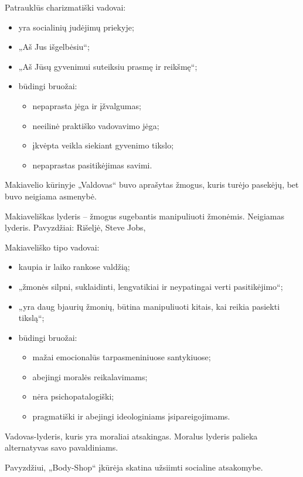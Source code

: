 Patrauklūs charizmatiški vadovai:
\begin{itemize}
  \item yra socialinių judėjimų priekyje;
  \item „Aš Jus išgelbėsiu“;
  \item „Aš Jūsų gyvenimui suteiksiu prasmę ir reikšmę“;
  \item būdingi bruožai:
    \begin{itemize}
      \item nepaprasta jėga ir įžvalgumas;
      \item neeilinė praktiško vadovavimo jėga;
      \item įkvėpta veikla siekiant gyvenimo tikslo;
      \item nepaprastas pasitikėjimas savimi.
    \end{itemize}
\end{itemize}

Makiavelio kūrinyje „Valdovas“ buvo aprašytas žmogus, kuris turėjo
pasekėjų, bet buvo neigiama asmenybė.

Makiaveliškas lyderis – žmogus sugebantis manipuliuoti žmonėmis.
Neigiamas lyderis. Pavyzdžiai: Rišeljė, Steve Jobs, 

Makiaveliško tipo vadovai:
\begin{itemize}
  \item kaupia ir laiko rankose valdžią;
  \item „žmonės silpni, suklaidinti, lengvatikiai ir neypatingai verti
    pasitikėjimo“;
  \item „yra daug bjaurių žmonių, būtina manipuliuoti kitais, kai reikia
    pasiekti tikslą“;
  \item būdingi bruožai:
    \begin{itemize}
      \item mažai emocionalūs tarpasmeniniuose santykiuose;
      \item abejingi moralės reikalavimams;
      \item nėra psichopatalogiški;
      \item pragmatiški ir abejingi ideologiniams įsipareigojimams.
    \end{itemize}
\end{itemize}

\begin{defn}
  Vadovas-lyderis, kuris yra moraliai atsakingas. Moralus lyderis
  palieka alternatyvas savo pavaldiniams.
  \begin{exmp}
    Pavyzdžiui, „Body-Shop“ įkūrėja skatina užsiimti socialine atsakomybe.
  \end{exmp}
\end{defn}

